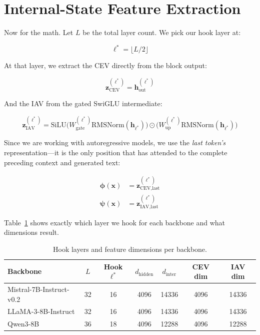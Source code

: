 \section{Internal-State Feature Extraction}
\label{sec:feature_extraction}

Now for the math. Let $L$ be the total layer count. We pick our hook layer at:

\begin{equation}
    \ell^* = \lfloor L/2 \rfloor
    \label{eq:layer_selection}
\end{equation}

\noindent At that layer, we extract the CEV directly from the block output:

\begin{equation}
    \mathbf{z}_{\text{CEV}}^{(\ell^*)} = \mathbf{h}_{\text{out}}^{(\ell^*)}
    \label{eq:cev_extract}
\end{equation}

\noindent And the IAV from the gated SwiGLU intermediate:

\begin{equation}
    \mathbf{z}_{\text{IAV}}^{(\ell^*)} = \text{SiLU}\bigl(W_{\text{gate}}^{(\ell^*)} \text{RMSNorm}(\mathbf{h}_{\ell^*})\bigr) \odot \bigl(W_{\text{up}}^{(\ell^*)} \text{RMSNorm}(\mathbf{h}_{\ell^*})\bigr)
    \label{eq:iav_extract}
\end{equation}

Since we are working with autoregressive models, we use the \emph{last token's} representation---it is the only position that has attended to the complete preceding context and generated text:

\begin{align}
    \boldsymbol{\phi}(\mathbf{x}) &= \mathbf{z}_{\text{CEV,last}}^{(\ell^*)} \label{eq:phi}\\[3pt]
    \boldsymbol{\psi}(\mathbf{x}) &= \mathbf{z}_{\text{IAV,last}}^{(\ell^*)} \label{eq:psi}
\end{align}

\noindent Table~\ref{tab:hook_layers} shows exactly which layer we hook for each backbone and what dimensions result.

\begin{table}[!htb]
\centering
\caption{Hook layers and feature dimensions per backbone.}
\label{tab:hook_layers}
\begin{tabular}{@{}lcccccc@{}}
\toprule
\textbf{Backbone} & $L$ & \textbf{Hook $\ell^*$} & $d_{\text{hidden}}$ & $d_{\text{inter}}$ & \textbf{CEV dim} & \textbf{IAV dim} \\
\midrule
Mistral-7B-Instruct-v0.2 & 32 & 16 & 4096 & 14336 & 4096 & 14336 \\
LLaMA-3-8B-Instruct      & 32 & 16 & 4096 & 14336 & 4096 & 14336 \\
Qwen3-8B                  & 36 & 18 & 4096 & 12288 & 4096 & 12288 \\
\bottomrule
\end{tabular}
\end{table}

